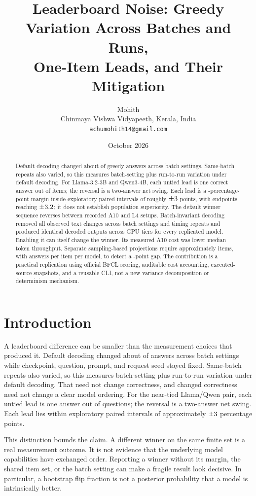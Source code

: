 \documentclass[10pt,twocolumn]{article}
\title{Leaderboard Noise: Greedy Variation Across Batches and Runs,\\One-Item Leads, and Their Mitigation}
\author{Mohith\\\small Chinmaya Vishwa Vidyapeeth, Kerala, India\\\small \texttt{achumohith14@gmail.com}}
\date{October 2026}
\begin{document}
\maketitle
\begin{abstract}
Default decoding changed about \TextRounded{} of greedy answers across batch settings. Same-batch repeats also varied, so this measures batch-setting plus run-to-run variation under default decoding. For Llama-3.2-3B and Qwen3-4B, each untied lead is one correct answer out of \NItems{} items; the reversal is a two-answer net swing. Each lead is a \OneItemGap{}-percentage-point margin inside exploratory paired intervals of roughly $\pm3{}$ points, with endpoints reaching $\pm3.2{}$; it does not establish population superiority. The default winner sequence reverses between recorded A10 and L4 setups. Batch-invariant decoding removed all observed text changes across batch settings and timing repeats and produced identical decoded outputs across GPU tiers for every replicated model. Enabling it can itself change the winner. Its measured A10 cost was \ThroughputLoss{} lower median token throughput. Separate sampling-based projections require approximately \ItemRangeRounded{} items, with \NSamples{} answers per item per model, to detect a \TargetGap{}-point gap. The contribution is a practical replication using official BFCL scoring, auditable cost accounting, executed-source snapshots, and a reusable CLI, not a new variance decomposition or determinism mechanism.
\end{abstract}

\section{Introduction}
A leaderboard difference can be smaller than the measurement choices that produced it. Default decoding changed about \TextRounded{} of answers across batch settings while checkpoint, question, prompt, and request seed stayed fixed. Same-batch repeats also varied, so this measures batch-setting plus run-to-run variation under default decoding. That need not change correctness, and changed correctness need not change a clear model ordering. For the near-tied Llama/Qwen pair, each untied lead is one answer out of \NItems{} questions; the reversal is a two-answer net swing. Each lead lies within exploratory paired intervals of approximately $\pm3{}$ percentage points.

This distinction bounds the claim. A different winner on the same finite set is a real measurement outcome. It is not evidence that the underlying model capabilities have exchanged order. Reporting a winner without its margin, the shared item set, or the batch setting can make a fragile result look decisive. In particular, a bootstrap flip fraction is not a posterior probability that a model is intrinsically better.
\end{document}
